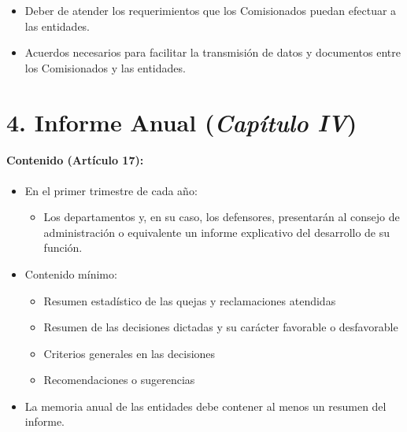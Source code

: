 \documentclass[
]{article}
\providecommand{\tightlist}{%
  \setlength{\itemsep}{0pt}\setlength{\parskip}{0pt}}
\begin{document}
\begin{itemize}
\tightlist
\item
  Deber de atender los requerimientos que los Comisionados puedan
  efectuar a las entidades.
\item
  Acuerdos necesarios para facilitar la transmisión de datos y
  documentos entre los Comisionados y las entidades.
\end{itemize}

\hypertarget{informe-anual-capuxedtulo-iv}{%
\section{\texorpdfstring{4. Informe Anual (\emph{Capítulo
IV})}{4. Informe Anual (Capítulo IV)}}\label{informe-anual-capuxedtulo-iv}}

\hypertarget{contenido-artuxedculo-17}{%
\paragraph{\texorpdfstring{Contenido (\textbf{Artículo
17}):}{Contenido (Artículo 17):}}\label{contenido-artuxedculo-17}}

\begin{itemize}
\tightlist
\item
  En el primer trimestre de cada año:

  \begin{itemize}
  \tightlist
  \item
    Los departamentos y, en su caso, los defensores, presentarán al
    consejo de administración o equivalente un informe explicativo del
    desarrollo de su función.
  \end{itemize}
\item
  Contenido mínimo:

  \begin{itemize}
  \tightlist
  \item
    Resumen estadístico de las quejas y reclamaciones atendidas
  \item
    Resumen de las decisiones dictadas y su carácter favorable o
    desfavorable
  \item
    Criterios generales en las decisiones
  \item
    Recomendaciones o sugerencias
  \end{itemize}
\item
  La memoria anual de las entidades debe contener al menos un resumen
  del informe.
\end{itemize}
\end{document}
